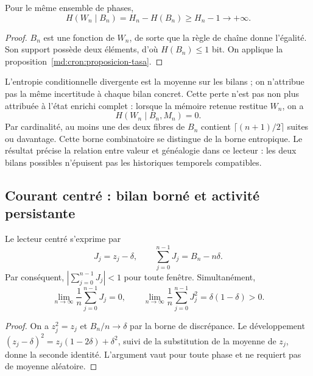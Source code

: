 \begin{corollary}
\label{md:cron:corolario-condicional}
Pour le même ensemble de phases,
\begin{equation}
 H(W_n\mid B_n)=H_n-H(B_n)
 \geq H_n-1\longrightarrow+\infty.
 \label{md:cron:entropia-condicional}
\end{equation}
\end{corollary}
\begin{proof}
$B_n$ est une fonction de $W_n$, de sorte que la règle de chaîne donne l'égalité. Son support possède deux éléments, d'où $H(B_n)\leq1$ bit. On applique la proposition~\ref{md:cron:proposicion-tasa}.
\end{proof}

L'entropie conditionnelle divergente est la moyenne sur les bilans ; on n'attribue pas la même incertitude à chaque bilan concret. Cette perte n'est pas non plus attribuée à l'état enrichi complet : lorsque la mémoire retenue restitue $W_n$, on a
\begin{equation}
 H(W_n\mid B_n,M_n)=0.
 \label{md:cron:restitucion-memoria}
\end{equation}
Par cardinalité, au moins une des deux fibres de $B_n$ contient $\lceil(n+1)/2\rceil$ suites ou davantage. Cette borne combinatoire se distingue de la borne entropique. Le résultat précise la relation entre valeur et généalogie dans ce lecteur : les deux bilans possibles n'épuisent pas les historiques temporels compatibles.

\subsection{Courant centré : bilan borné et activité persistante}
\label{md:cron:corriente}

Le lecteur centré s'exprime par
\begin{equation}
 J_j=z_j-\delta,\qquad
 \sum_{j=0}^{n-1}J_j=B_n-n\delta.
 \label{md:cron:corriente-definicion}
\end{equation}
Par conséquent, $\left|\sum_{j=0}^{n-1}J_j\right|<1$ pour toute fenêtre. Simultanément,
\begin{equation}
 \lim_{n\to\infty}\frac1n\sum_{j=0}^{n-1}J_j=0,\qquad
 \lim_{n\to\infty}\frac1n\sum_{j=0}^{n-1}J_j^2
 =\delta(1-\delta)>0.
 \label{md:cron:actividad}
\end{equation}
\begin{proof}
On a $z_j^2=z_j$ et $B_n/n\to\delta$ par la borne de discrépance. Le développement $(z_j-\delta)^2=z_j(1-2\delta)+\delta^2$, suivi de la substitution de la moyenne de $z_j$, donne la seconde identité. L'argument vaut pour toute phase et ne requiert pas de moyenne aléatoire.
\end{proof}

